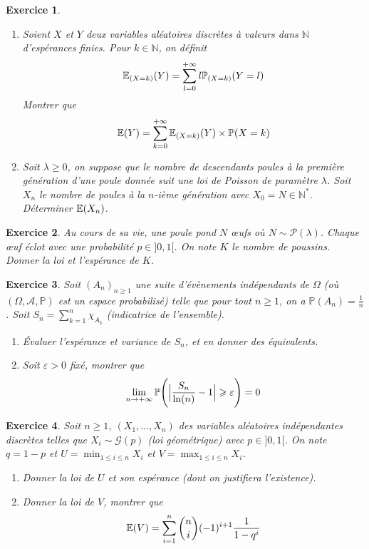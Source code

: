 \documentclass[12pt]{article}
\newtheorem{exercise}{Exercice}[section]
\theoremstyle{remark}
\theoremstyle{remark}
\newcommand{\N}{\mathbb{N}} \newcommand{\Z}{\mathbb{Z}}
\renewcommand{\P}{\mathbb{P}} \newcommand{\im}{\emph{Im}}
\begin{document}
\begin{exercise}
	\phantom{}
	\begin{enumerate}
		\item
		Soient $X$ et $Y$ deux variables aléatoires discrètes à valeurs dans $\N$
		d'espérances finies. Pour $k\in\N$, on définit
		$$\E_{(X=k)}(Y)=\sum_{l=0}^{+\infty}l\P_{(X=k)}(Y=l)$$ Montrer que
		$$\E(Y)=\sum_{k=0}^{+\infty}\E_{(X=k)}(Y)\times\P(X=k)$$
		\item
		Soit $\lambda\geqslant0$, on suppose que le nombre de descendants poules à
		la première génération d'une poule donnée suit une loi de Poisson de
		paramètre $\lambda$. Soit $X_{n}$ le nombre de poules à la $n$-ième
		génération avec $X_{0}=N\in\N^{*}$. Déterminer $\mathbb{E}(X_{n})$.
	\end{enumerate}
\end{exercise}

\begin{exercise}
	Au cours de sa vie, une poule pond $N$ \oe ufs où $N\sim\mathcal{P}(\lambda)$.
	Chaque \oe uf éclot avec une probabilité $p\in]0,1[$. On note $K$ le nombre de
	poussins. Donner la loi et l'espérance de $K$.
\end{exercise}

\begin{exercise}
	Soit $(A_{n})_{n\geqslant1}$ une suite d'évènements indépendants de $\Omega$
	(où $(\Omega,\mathcal{A},\P)$ est un espace probabilisé) telle que pour tout
	$n\geqslant1$, on a $\P(A_{n})=\frac{1}{n}$. Soit
	$S_{n}=\sum_{k=1}^{n}\chi_{A_{k}}$ (indicatrice de l'ensemble).
	\begin{enumerate}
		\item
		Évaluer l'espérance et variance de $S_{n}$, et en donner des équivalents.
		\item
		Soit $\varepsilon>0$ fixé, montrer que 
		$$\lim\limits_{n\to+\infty}\P\Biggl(\Bigl\vert\frac{S_{n}}{\ln(n)}-1\Bigr\vert\geqslant\varepsilon\Biggr)=0$$
	\end{enumerate}
\end{exercise}

\begin{exercise}
	Soit $n\geqslant1$, $(X_{1},\dots,X_{n})$ des variables aléatoires
	indépendantes discrètes telles que $X_{i}\sim\mathcal{G}(p)$ (loi géométrique)
	avec $p\in]0,1[$. On note $q=1-p$ et $U=\min_{1\leqslant i\leqslant n}X_{i}$
	et $V=\max_{1\leqslant i\leqslant n}X_{i}$.
	\begin{enumerate}
		\item
		Donner la loi de $U$ et son espérance (dont on justifiera l'existence).
		\item
		Donner la loi de $V$, montrer que
		$$\mathbb{E}(V)=\sum_{i=1}^{n}\binom{n}{i}(-1)^{i+1}\frac{1}{1-q^{i}}$$
	\end{enumerate}
\end{exercise}
\end{document}
